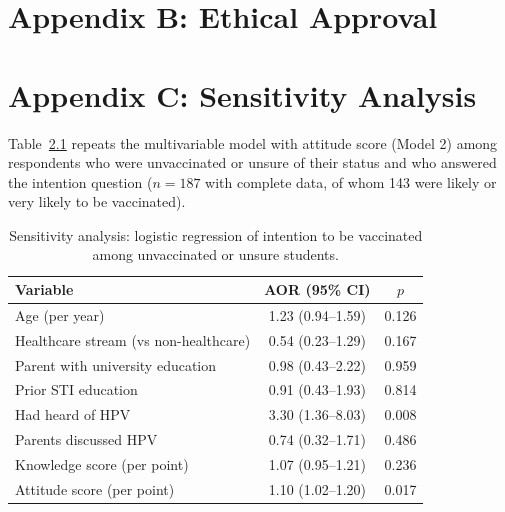\chapter{Appendix B: Ethical Approval}

\clearpage
\chapter{Appendix C: Sensitivity Analysis}
\onehalfspacing
Table~\ref{tab:sens} repeats the multivariable model with attitude score (Model 2) among respondents who were unvaccinated or unsure of their status and who answered the intention question ($n=187$ with complete data, of whom 143 were likely or very likely to be vaccinated).

\begin{table}[htbp]\centering\small
\caption{Sensitivity analysis: logistic regression of intention to be vaccinated among unvaccinated or unsure students.}\label{tab:sens}
\begin{tabularx}{\textwidth}{@{}>{\raggedright\arraybackslash}X cc@{}}\toprule
Variable & AOR (95\% CI) & $p$ \\\midrule
Age (per year) & 1.23 (0.94--1.59) & 0.126 \\
Healthcare stream (vs non-healthcare) & 0.54 (0.23--1.29) & 0.167 \\
Parent with university education & 0.98 (0.43--2.22) & 0.959 \\
Prior STI education & 0.91 (0.43--1.93) & 0.814 \\
Had heard of HPV & 3.30 (1.36--8.03) & 0.008 \\
Parents discussed HPV & 0.74 (0.32--1.71) & 0.486 \\
Knowledge score (per point) & 1.07 (0.95--1.21) & 0.236 \\
Attitude score (per point) & 1.10 (1.02--1.20) & 0.017 \\
\bottomrule\end{tabularx}\end{table}
